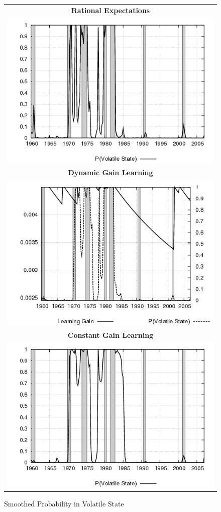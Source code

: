 \documentclass[12pt]{article}
\begin{document}
\begin{figure}[ht]
\caption{Smoothed Probability in Volatile State}\label{fg:pvol}
\begin{center}
\begin{tabular}{c}
\textbf{Rational Expectations} \\  
\includegraphics[scale=0.5]{results_re/states_sm.png} \\
\textbf{Dynamic Gain Learning} \\
\includegraphics[scale=0.5]{results_dg8_wlsinit/states_sm.png} \\
\textbf{Constant Gain Learning} \\
\includegraphics[scale=0.5]{results_cg_wlsinit/states_sm.png} 

\end{tabular}
\end{center}
\end{figure}
\end{document}
